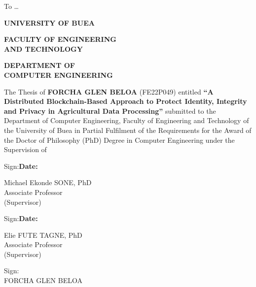 \documentclass[12pt,a4paper,oneside]{book}
\begin{document}
\begin{ubonehalfspace}
\vspace{2\baselineskip}
\begin{center}
To \dots
\end{center}
\clearpage
 \end{ubonehalfspace}
\begin{singlespace}

\begin{center}
  \textbf{UNIVERSITY OF BUEA}
\end{center}

\vspace{\baselineskip}

\noindent
\begin{minipage}[t]{0.56\textwidth}
  \raggedright
  \textbf{FACULTY OF ENGINEERING\\AND TECHNOLOGY}
\end{minipage}\begin{minipage}[t]{0.44\textwidth}
  \raggedright
  \textbf{DEPARTMENT OF\\COMPUTER ENGINEERING}
\end{minipage}

\vspace{2\baselineskip}

The Thesis of \textbf{FORCHA GLEN BELOA} (FE22P049) entitled
\textbf{``A Distributed Blockchain-Based Approach to Protect Identity,
Integrity and Privacy in Agricultural Data Processing''} submitted to the
Department of Computer Engineering, Faculty of Engineering and Technology
of the University of Buea in Partial Fulfilment of the Requirements for
the Award of the Doctor of Philosophy (PhD) Degree in Computer Engineering
under the Supervision of

\vspace{2\baselineskip}

Sign:\hrulefill \hfill \textbf{Date:}\hrulefill

\vspace{\baselineskip}
\noindent Michael Ekonde SONE, PhD\\
Associate Professor\\
(Supervisor)

\vspace{2\baselineskip}

Sign:\hrulefill \hfill \textbf{Date:}\hrulefill

\vspace{\baselineskip}
\noindent Elie FUTE TAGNE, PhD\\
Associate Professor\\
(Supervisor)

\vspace{2\baselineskip}

\begin{center}
Sign:\hrulefill\\
FORCHA GLEN BELOA
\end{center}

\end{singlespace}
\end{document}
